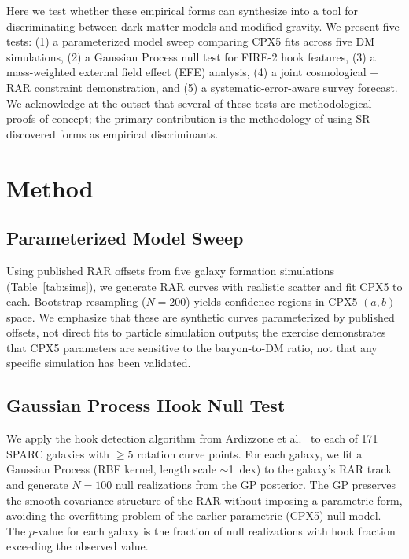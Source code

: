 \documentclass[twocolumn]{aastex631}
\begin{document}
Here we test whether these empirical forms can synthesize into a tool for
discriminating between dark matter models and modified gravity.  We present
five tests: (1) a parameterized model sweep comparing CPX5 fits across
five DM simulations, (2) a Gaussian Process null test for FIRE-2 hook
features, (3) a mass-weighted external field effect (EFE) analysis,
(4) a joint cosmological + RAR constraint demonstration, and (5) a
systematic-error-aware survey forecast.  We acknowledge at the outset that
several of these tests are methodological proofs of concept; the primary
contribution is the methodology of using SR-discovered forms as empirical
discriminants.

\section{Method}

\subsection{Parameterized Model Sweep}

Using published RAR offsets from five galaxy formation simulations
(Table~\ref{tab:sims}), we generate RAR curves with realistic scatter and
fit CPX5 to each.  Bootstrap resampling ($N=200$) yields confidence
regions in CPX5 $(a,b)$ space.  We emphasize that these are synthetic
curves parameterized by published offsets, not direct fits to particle
simulation outputs; the exercise demonstrates that CPX5 parameters
are sensitive to the baryon-to-DM ratio, not that any specific simulation
has been validated.

\subsection{Gaussian Process Hook Null Test}

We apply the hook detection algorithm from Ardizzone et
al.~\cite{ardizzone2023} to each of 171 SPARC galaxies with $\ge 5$
rotation curve points.  For each galaxy, we fit a Gaussian Process (RBF
kernel, length scale $\sim$1~dex) to the galaxy's RAR track and generate
$N=100$ null realizations from the GP posterior.  The GP preserves the
smooth covariance structure of the RAR without imposing a parametric
form, avoiding the overfitting problem of the earlier parametric
(CPX5) null model.  The $p$-value for each galaxy is the fraction of null
realizations with hook fraction exceeding the observed value.
\end{document}
